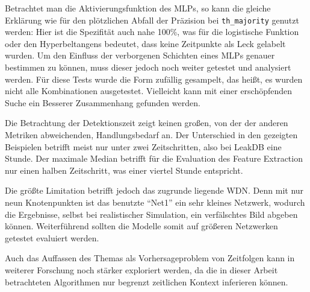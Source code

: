 Betrachtet man die Aktivierungsfunktion des MLPs, so kann die gleiche Erklärung wie für den plötzlichen Abfall
 der Präzision bei \texttt{th\_majority} genutzt werden: Hier ist die Spezifität auch nahe 100\%, was für die
 logistische Funktion oder den Hyperbeltangens bedeutet, dass keine Zeitpunkte als Leck gelabelt wurden. Um
 den Einfluss der verborgenen Schichten eines MLPs genauer bestimmen zu können, muss dieser jedoch noch weiter
 getestet und analysiert werden. Für diese Tests wurde die Form zufällig gesampelt, das heißt, es wurden nicht
 alle Kombinationen ausgetestet. Vielleicht kann mit einer erschöpfenden Suche ein Besserer Zusammenhang
 gefunden werden.

Die Betrachtung der Detektionszeit zeigt keinen großen, von der der anderen Metriken abweichenden,
 Handlungsbedarf an. Der Unterschied in den gezeigten Beispielen betrifft meist nur unter zwei Zeitschritten,
 also bei LeakDB eine Stunde. Der maximale Median betrifft für die Evaluation des Feature Extraction nur einen
 halben Zeitschritt, was einer viertel Stunde entspricht.

Die größte Limitation betrifft jedoch das zugrunde liegende WDN. Denn mit nur neun Knotenpunkten ist das
 benutzte “Net1” ein sehr kleines Netzwerk, wodurch die Ergebnisse, selbst bei realistischer Simulation, ein
 verfälschtes Bild abgeben können. Weiterführend sollten die Modelle somit auf größeren Netzwerken getestet
 evaluiert werden.

Auch das Auffassen des Themas als Vorhersageproblem von Zeitfolgen kann in weiterer Forschung noch stärker
exploriert werden, da die in dieser Arbeit betrachteten Algorithmen nur begrenzt zeitlichen Kontext inferieren
können.


